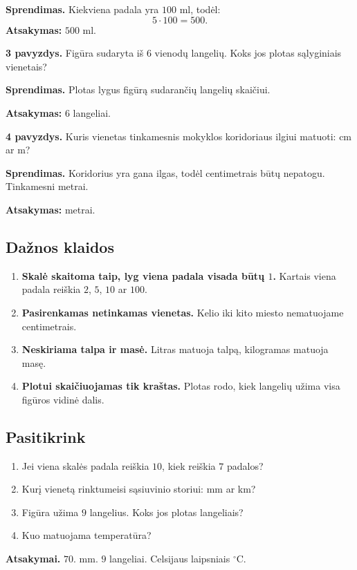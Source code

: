 \textbf{Sprendimas.} Kiekviena padala yra \(100\) ml, todėl:
\[
5\cdot 100=500.
\]
\textbf{Atsakymas:} \(500\) ml.

\textbf{3 pavyzdys.} Figūra sudaryta iš \(6\) vienodų langelių. Koks jos plotas sąlyginiais vienetais?

\textbf{Sprendimas.} Plotas lygus figūrą sudarančių langelių skaičiui.

\textbf{Atsakymas:} \(6\) langeliai.

\textbf{4 pavyzdys.} Kuris vienetas tinkamesnis mokyklos koridoriaus ilgiui matuoti: cm ar m?

\textbf{Sprendimas.} Koridorius yra gana ilgas, todėl centimetrais būtų nepatogu. Tinkamesni metrai.

\textbf{Atsakymas:} metrai.

\subsection{Dažnos klaidos}

\begin{enumerate}
\item \textbf{Skalė skaitoma taip, lyg viena padala visada būtų \(1\).} Kartais viena padala reiškia \(2\), \(5\), \(10\) ar \(100\).
\item \textbf{Pasirenkamas netinkamas vienetas.} Kelio iki kito miesto nematuojame centimetrais.
\item \textbf{Neskiriama talpa ir masė.} Litras matuoja talpą, kilogramas matuoja masę.
\item \textbf{Plotui skaičiuojamas tik kraštas.} Plotas rodo, kiek langelių užima visa figūros vidinė dalis.
\end{enumerate}

\subsection{Pasitikrink}

\begin{enumerate}
\item Jei viena skalės padala reiškia \(10\), kiek reiškia \(7\) padalos?
\item Kurį vienetą rinktumeisi sąsiuvinio storiui: mm ar km?
\item Figūra užima \(9\) langelius. Koks jos plotas langeliais?
\item Kuo matuojama temperatūra?
\end{enumerate}

\textbf{Atsakymai.} \(70\). mm. \(9\) langeliai. Celsijaus laipsniais \({}^{\circ}\text{C}\).

